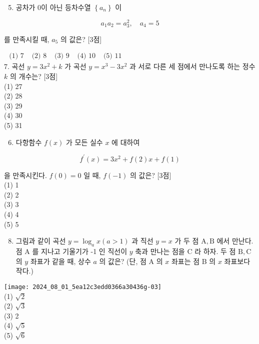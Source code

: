 \documentclass[10pt]{article}
\begin{document}
\begin{enumerate}
  \setcounter{enumi}{4}
  \item 공차가 0이 아닌 등차수열 $\left\{a_{n}\right\}$ 이
\end{enumerate}

\[
a_{1} a_{2}=a_{3}^{2}, \quad a_{4}=5
\]

를 만족시킬 때, $a_{5}$ 의 값은? [3점]

$\begin{array}{lllll}\text { (1) } 7 & \text { (2) } 8 & \text { (3) } 9 & \text { (4) } 10 & \text { (5) } 11\end{array}$\\
7. 곡선 $y=3 x^{2}+k$ 가 곡선 $y=x^{3}-3 x^{2}$ 과 서로 다른 세 점에서 만나도록 하는 정수 $k$ 의 개수는? [3점]\\
(1) 27\\
(2) 28\\
(3) 29\\
(4) 30\\
(5) 31

\begin{enumerate}
  \setcounter{enumi}{5}
  \item 다항함수 $f(x)$ 가 모든 실수 $x$ 에 대하여
\end{enumerate}

\[
f^{\prime}(x)=3 x^{2}+f(2) x+f(1)
\]

을 만족시킨다. $f(0)=0$ 일 때, $f(-1)$ 의 값은? [3점]\\
(1) 1\\
(2) 2\\
(3) 3\\
(4) 4\\
(5) 5

\begin{enumerate}
  \setcounter{enumi}{7}
  \item 그림과 같이 곡선 $y=\log _{a} x(a>1)$ 과 직선 $y=x$ 가 두 점 $\mathrm{A}, \mathrm{B}$ 에서 만난다. 점 A 를 지나고 기울기가 -1 인 직선이 $y$ 축과 만나는 점을 C 라 하자. 두 점 $\mathrm{B}, \mathrm{C}$ 의 $y$ 좌표가 같을 때, 상수 $a$ 의 값은? (단, 점 A 의 $x$ 좌표는 점 B 의 $x$ 좌표보다 작다.)
\end{enumerate}

\texttt{[image: 2024\_08\_01\_5ea12c3edd0366a30436g-03]}\\
(1) $\sqrt{2}$\\
(2) $\sqrt{3}$\\
(3) 2\\
(4) $\sqrt{5}$\\
(5) $\sqrt{6}$
\end{document}
